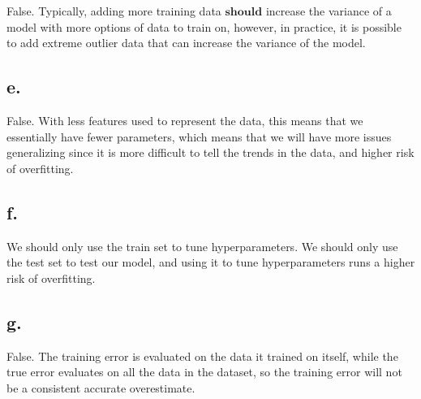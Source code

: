 \documentclass{article}
\newcommand{\1}{\mathbf{1}}
\begin{document}
{False. Typically, adding more training data $\textbf{should}$ increase the variance of a model with more options of data to train on, however, in practice, it is possible to add extreme outlier data that can increase the variance of the model.

\subsection*{e.}

False. With less features used to represent the data, this means that we essentially have fewer parameters, which means that we will have more issues generalizing since it is more difficult to tell the trends in the data, and higher risk of overfitting.

\subsection*{f.}

We should only use the train set to tune hyperparameters. We should only use the test set to test our model, and using it to tune hyperparameters runs a higher risk of overfitting.

\subsection*{g.}

False. The training error is evaluated on the data it trained on itself, while the true error evaluates on all the data in the dataset, so the training error will not be a consistent accurate overestimate.

}
\end{document}
